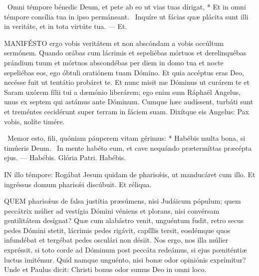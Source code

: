 \R\ Omni témpore bénedic Deum, et pete ab eo ut vias tuas dírigat, * Et in omni témpore consília tua in ipso permáneant. \V\ Inquíre ut fácias quæ plácita sunt illi in veritáte, et in tota virtúte tua. — Et.



\lettrine[lines=2]{M}{ANIFÉSTO} ergo vobis veritátem et non abscóndam a vobis occúltum sermónem. Quando orábas cum lácrimis et sepeliébas mórtuos et derelinquébas prándium tuum et mórtuos abscondébas per diem in domo tua et nocte sepeliébas eos, ego óbtuli oratiónem tuam Dómino. Et quia accéptus eras Deo, necésse fuit ut tentátio probáret te. Et nunc misit me Dóminus ut curárem te et Saram uxórem fílii tui a dæmónio liberárem; ego enim sum Ráphaël Angelus, unus ex septem qui astámus ante Dóminum. Cumque hæc audíssent, turbáti sunt et treméntes cecidérunt super terram in fáciem suam. Dixítque eis Angelus: Pax vobis, nolíte timére.

\R\ Memor esto, fili, quóniam páuperem vitam gérimus: * Habébis multa bona, si timúeris Deum. \V\ In mente habéto eum, et cave nequándo prætermíttas præcépta ejus. — Habébis. Glória Patri. Habébis.




\lettrine[lines=2]{I}{N} illo témpore: Rogábat Jesum quidam de pharisǽis, ut manducáret cum illo. Et ingréssus domum pharisǽi discúbuit. Et réliqua.



\lettrine[lines=2]{Q}{UEM} pharisǽus de falsa justítia præsúmens, nisi Judáicum pópulum; quem peccátrix múlier ad vestígia Dómini véniens et plorans, nisi convérsam gentilitátem desígnat? Quæ cum alabástro venit, unguéntum fudit, retro secus pedes Dómini stetit, lácrimis pedes rigávit, capíllis tersit, eosdémque quos infundébat et tergébat pedes osculári non désiit. Nos ergo, nos illa múlier expréssit, si toto corde ad Dóminum post peccáta redeámus, si ejus pœniténtiæ luctus imitémur. Quid namque unguénto, nisi bonæ odor opiniónis exprímitur? Unde et Paulus dicit: Christi bonus odor sumus Deo in omni loco.

